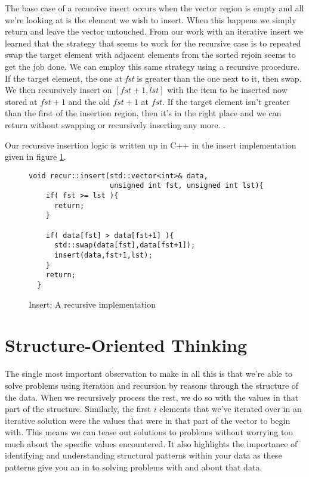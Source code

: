 \documentclass[]{tufte-handout}
\begin{document}
The base case of a recursive insert occurs when the vector region is empty and all we're looking at is the element we wish to insert. When this happens we simply return and leave the vector untouched. From our work with an iterative insert we learned that the strategy that seems to work for the recursive case is to repeated swap the target element with adjacent elements from the sorted rejoin seems to get the job done. We can employ this same strategy using a recursive procedure. If the target element, the one at \textit{fst} is greater than the one next to it, then swap. We then recursively insert on $[fst+1,lst]$ with the item to be inserted now stored at $fst+1$ and the old $fst+1$ at $fst$. If the target element isn't greater than the first of the insertion region, then it's in the right place and we can return without swapping or recursively inserting any more. . 

Our recursive insertion logic is written up in C++ in the insert implementation given in figure \ref{code:insertrecipml}.
\begin{figure}[!htbp]
\begin{lstlisting}
void recur::insert(std::vector<int>& data,
	     	       unsigned int fst, unsigned int lst){
    if( fst >= lst ){
      return;
    }

    if( data[fst] > data[fst+1] ){
      std::swap(data[fst],data[fst+1]);
      insert(data,fst+1,lst);
    }
    return;    
  }
\end{lstlisting}
\caption{Insert: A recursive implementation}
\label{code:insertrecipml}
\end{figure} 

\section{Structure-Oriented Thinking}

The single most important observation to make in all this is that we're able to solve problems using iteration and recursion by reasons through the structure of the data.  When we recursively process the rest, we do so with the values in that part of the structure.  Similarly, the first $i$ elements that we've iterated over in an iterative solution were the values that were in that part of the vector to begin with. This means we can tease out solutions to problems without worrying too much about the specific values encountered. It also highlights the importance of identifying and understanding structural patterns within your data as these patterns give you an in to solving problems with and about that data. 
\end{document}
